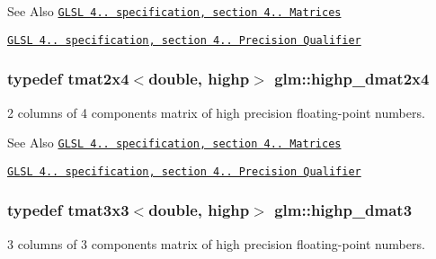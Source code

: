 \begin{DoxySeeAlso}{See Also}
\href{http://www.opengl.org/registry/doc/GLSLangSpec.4.20.8.pdf}{\tt G\-L\-S\-L 4.. specification, section 4.. Matrices} 

\href{http://www.opengl.org/registry/doc/GLSLangSpec.4.20.8.pdf}{\tt G\-L\-S\-L 4.. specification, section 4.. Precision Qualifier} 
\end{DoxySeeAlso}
\hypertarget{group__core__precision_ga2b1bf87a8f8fbc895127c6bfde7a271e}{
\subsubsection[{highp\-\_\-dmat2x4}]{\setlength{\rightskip}{0pt plus 5cm}typedef tmat2x4$<$double, highp$>$ {\bf glm\-::highp\-\_\-dmat2x4}}}\label{group__core__precision_ga2b1bf87a8f8fbc895127c6bfde7a271e}
2 columns of 4 components matrix of high precision floating-\/point numbers.

\begin{DoxySeeAlso}{See Also}
\href{http://www.opengl.org/registry/doc/GLSLangSpec.4.20.8.pdf}{\tt G\-L\-S\-L 4.. specification, section 4.. Matrices} 

\href{http://www.opengl.org/registry/doc/GLSLangSpec.4.20.8.pdf}{\tt G\-L\-S\-L 4.. specification, section 4.. Precision Qualifier} 
\end{DoxySeeAlso}
\hypertarget{group__core__precision_gafa89ae412491446e508782ddd9bc55c7}{
\subsubsection[{highp\-\_\-dmat3}]{\setlength{\rightskip}{0pt plus 5cm}typedef tmat3x3$<$double, highp$>$ {\bf glm\-::highp\-\_\-dmat3}}}\label{group__core__precision_gafa89ae412491446e508782ddd9bc55c7}
3 columns of 3 components matrix of high precision floating-\/point numbers.

